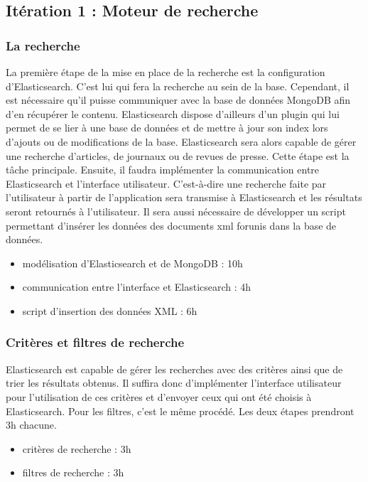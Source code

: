 \subsection{Itération 1 : Moteur de recherche}
\label{subsec:moteur_rech}
	\subsubsection{La recherche} 
	\label{subsubsec:recherche}
		La première étape de la mise en place de la recherche est la configuration d'Elasticsearch. C'est lui qui fera la recherche au sein de la base. Cependant, il est nécessaire qu'il puisse communiquer avec la base de données MongoDB afin d'en récupérer le contenu. Elasticsearch dispose d'ailleurs d'un plugin qui lui permet de se lier à une base de données et de mettre à jour son index lors d'ajouts ou de modifications de la base. Elasticsearch sera alors capable de gérer une recherche d'articles, de journaux ou de revues de presse. Cette étape est la tâche principale. Ensuite, il faudra implémenter la communication entre Elasticsearch et l'interface utilisateur. C'est-à-dire une recherche faite par l'utilisateur à partir de l'application sera transmise à Elasticsearch et les résultats seront retournés à l'utilisateur. Il sera aussi nécessaire de développer un script permettant d'insérer les données des documents xml forunis dans la base de données.

		\begin{itemize}
			\item modélisation d'Elasticsearch et de MongoDB : 10h
			\item communication entre l'interface et Elasticsearch : 4h
			\item script d'insertion des données XML : 6h
		\end{itemize}

	\subsubsection{Critères et filtres de recherche} 
	\label{subsubsec:crit_filtre}
		Elasticsearch est capable de gérer les recherches avec des critères ainsi que de trier les résultats obtenus. Il suffira donc d'implémenter l'interface utilisateur pour l'utilisation de ces critères et d'envoyer ceux qui ont été choisis à Elasticsearch. Pour les filtres, c'est le même procédé. Les deux étapes prendront 3h chacune.

		\begin{itemize}
			\item critères de recherche : 3h
			\item filtres de recherche : 3h
		\end{itemize}

